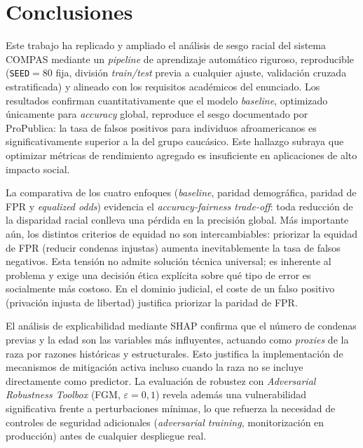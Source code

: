 \documentclass[11pt,a4paper]{article}
\begin{document}
\section{Conclusiones}
\label{sec:conclusiones}

Este trabajo ha replicado y ampliado el análisis de sesgo racial del sistema COMPAS mediante un \textit{pipeline} de aprendizaje automático riguroso, reproducible (\texttt{SEED}$=80$ fija, división \textit{train/test} previa a cualquier ajuste, validación cruzada estratificada) y alineado con los requisitos académicos del enunciado. Los resultados confirman cuantitativamente que el modelo \textit{baseline}, optimizado únicamente para \textit{accuracy} global, reproduce el sesgo documentado por ProPublica: la tasa de falsos positivos para individuos afroamericanos es significativamente superior a la del grupo caucásico. Este hallazgo subraya que optimizar métricas de rendimiento agregado es insuficiente en aplicaciones de alto impacto social.

La comparativa de los cuatro enfoques (\textit{baseline}, paridad demográfica, paridad de FPR y \textit{equalized odds}) evidencia el \textit{accuracy-fairness trade-off}: toda reducción de la disparidad racial conlleva una pérdida en la precisión global. Más importante aún, los distintos criterios de equidad no son intercambiables: priorizar la equidad de FPR (reducir condenas injustas) aumenta inevitablemente la tasa de falsos negativos. Esta tensión no admite solución técnica universal; es inherente al problema y exige una decisión ética explícita sobre qué tipo de error es socialmente más costoso. En el dominio judicial, el coste de un falso positivo (privación injusta de libertad) justifica priorizar la paridad de FPR.

El análisis de explicabilidad mediante SHAP confirma que el número de condenas previas y la edad son las variables más influyentes, actuando como \textit{proxies} de la raza por razones históricas y estructurales. Esto justifica la implementación de mecanismos de mitigación activa incluso cuando la raza no se incluye directamente como predictor. La evaluación de robustez con \textit{Adversarial Robustness Toolbox} (FGM, $\varepsilon=0{,}1$) revela además una vulnerabilidad significativa frente a perturbaciones mínimas, lo que refuerza la necesidad de controles de seguridad adicionales (\textit{adversarial training}, monitorización en producción) antes de cualquier despliegue real.
\end{document}
